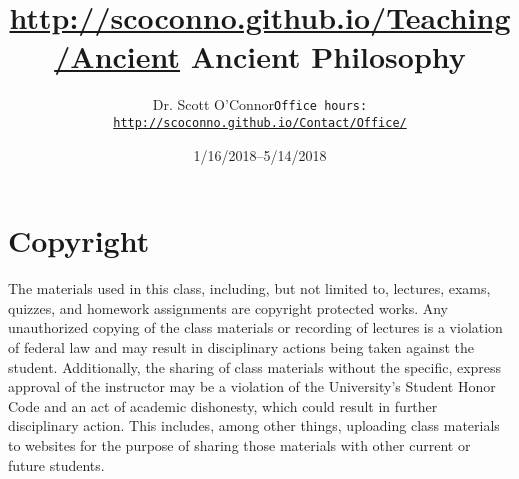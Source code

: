 \documentclass[article,oneside]{memoir}
\def\myauthor{Author}
\def\mytitle{Title}
\def\mycopyright{\myauthor}
\def\myweb{\href{http://scoconno.github.io/Teaching/Ancient}{http://scoconno.github.io/Teaching/Ancient}}
\def\myauthor{Dr. Scott O'Connor}
\def\mytitle{{\normalsize \myweb  \newline} \HUGE Ancient Philosophy}
\begin{document}
\setsansfont[Mapping=tex-text]{Myriad Pro} 
\setmonofont[Mapping=tex-text,Scale=0.8]{Minion Pro} 

\def\ind{\hangindent=1 true cm\hangafter=1 \noindent}
\def\labelitemi{$\cdot$}


\title{\LARGE \mytitle}     
\author{\Large\myauthor \newline \footnotesize\texttt{\noindent Office hours: \href{http://scoconno.github.io/Contact/Office/}{http://scoconno.github.io/Contact/Office/}}}
\date{1/16/2018--5/14/2018}



\maketitle




%
%

\section{Copyright}
The materials used in this class, including, but not limited to, lectures, exams, quizzes, and homework assignments are copyright protected works.  Any unauthorized copying of the class materials or recording of lectures is a violation of federal law and may result in disciplinary actions being taken against the student.  Additionally, the sharing of class materials without the specific, express approval of the instructor may be a violation of the University's Student Honor Code and an act of academic dishonesty, which could result in further disciplinary action.  This includes, among other things, uploading class materials to websites for the purpose of sharing those materials with other current or future students. 
\end{document}
